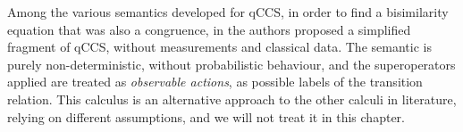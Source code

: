 Among the various semantics developed for qCCS, in order to find a bisimilarity equation that was also a congruence, in \cite{yingAlgebraQuantumProcesses2010} the authors proposed a simplified fragment of qCCS, without measurements and classical data. The semantic is purely non-deterministic, without probabilistic behaviour, and the superoperators applied are treated as \textit{observable actions}, as possible labels of the transition relation. This calculus is an alternative approach to the other calculi in literature, relying on different assumptions, and we will not treat it in this chapter.
